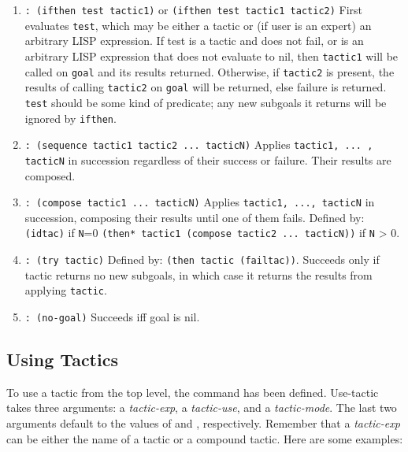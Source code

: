 \begin{enumerate}
\item {\tt {}: (ifthen test tactic1)} or \newline{}
        {\tt (ifthen test tactic1 tactic2)}\newline{}
First evaluates {\tt test}, which may be either a tactic or (if user is an expert) an arbitrary LISP expression.  If test is a tactic and does not fail, or is an arbitrary LISP expression that does not evaluate to nil, then {\tt tactic1} will be called on {\tt goal} and its results returned. Otherwise, if {\tt tactic2} is present, the results of calling {\tt tactic2} on {\tt goal} will be returned, else failure is returned.  {\tt test} should be some kind of predicate; any new subgoals it returns will be ignored by {\tt ifthen}.

\item {\tt {}: (sequence tactic1 tactic2 ... tacticN)}\newline{}
Applies {\tt tactic1, ... , tacticN} in succession regardless of their success or failure.  Their results are composed.

\item {\tt {}: (compose tactic1 ... tacticN)}\newline{}
Applies {\tt tactic1, ..., tacticN} in succession, composing their results until one of them fails.  Defined by:\newline{}
{\tt (idtac)} if {\tt N}=0\newline{}
{\tt (then* tactic1 (compose tactic2 ... tacticN))} if {\tt N} > 0.

\item {\tt {}: (try tactic)}\newline{}
Defined by: {\tt (then tactic (failtac))}.  Succeeds only if tactic returns no new subgoals, in which case it returns the results from applying {\tt tactic}.

\item {\tt {}: (no-goal)}\newline{}
Succeeds iff goal is nil.
\end{enumerate}


\subsection{Using Tactics}
\label{usetac}

To use a tactic from the top level, the command  has
been defined.  Use-tactic takes three arguments: a {\it tactic-exp}, a
{\it tactic-use},
and a {\it tactic-mode}.  The last two arguments default to the values of
 and , respectively.
Remember that a {\it tactic-exp} can be either the name of
a tactic or a compound tactic.  Here are some examples:

